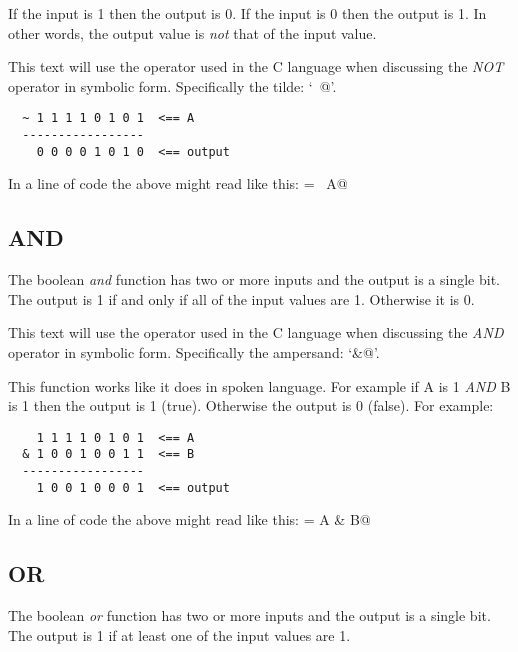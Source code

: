 If the input is 1 then the output is 0.  If the input is 0 then the
output is 1.  In other words, the output value is {\em not} that of the 
input value.

This text will use the operator used in the C language when discussing 
the {\em NOT} operator in symbolic form.  Specifically the tilde: `\verb@~@'.

\begin{verbatim}
  ~ 1 1 1 1 0 1 0 1  <== A
  -----------------
    0 0 0 0 1 0 1 0  <== output
\end{verbatim}

In a line of code the above might read like this: \verb@output = ~A@

\subsection{AND}

The boolean {\em and} function has two or more inputs and the output is a
single bit.  The output is 1 if and only if all of the input values are 1.
Otherwise it is 0.

This text will use the operator used in the C language when discussing 
the {\em AND} operator in symbolic form.  Specifically the ampersand: `\verb@&@'.

This function works like it does in spoken language.  For example
if A is 1 {\em AND} B is 1 then the output is 1 (true).
Otherwise the output is 0 (false).  For example:

\begin{verbatim}
    1 1 1 1 0 1 0 1  <== A
  & 1 0 0 1 0 0 1 1  <== B
  -----------------
    1 0 0 1 0 0 0 1  <== output
\end{verbatim}

In a line of code the above might read like this: \verb@output = A & B@

\subsection{OR}

The boolean {\em or} function has two or more inputs and the output is a
single bit.  The output is 1 if at least one of the input values are 1.

